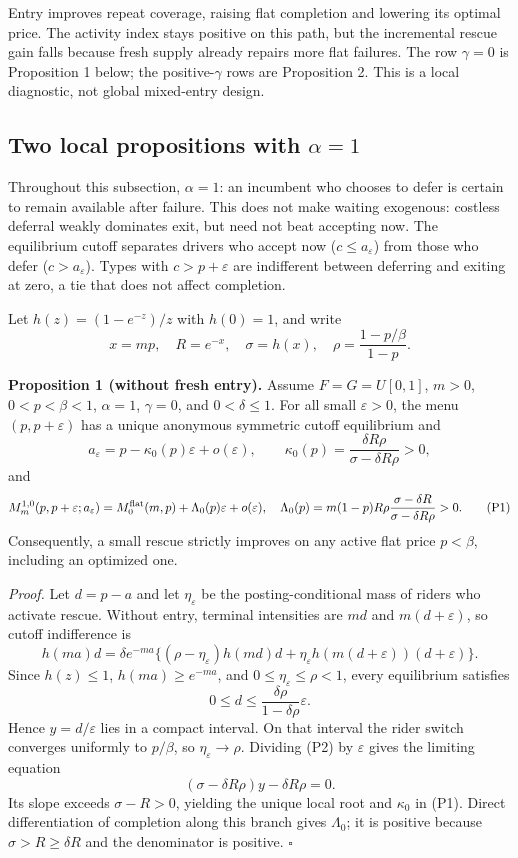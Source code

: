 \documentclass[11pt]{article}
\begin{document}
\noindent Entry improves repeat coverage, raising flat completion and lowering
its optimal price.  The activity index stays positive on this path, but the
incremental rescue gain falls because fresh supply already repairs more flat
failures.  The row $\gamma=0$ is Proposition 1 below; the positive-$\gamma$
rows are Proposition 2.  This is a local diagnostic, not global mixed-entry
design.

\clearpage
\subsection{Two local propositions with $\alpha=1$}

Throughout this subsection, $\alpha=1$: an incumbent who chooses to defer is
certain to remain available after failure.  This does not make waiting
exogenous: costless deferral weakly dominates exit, but need not beat accepting
now.  The equilibrium cutoff separates drivers who accept now
($c\le a_\varepsilon$) from those who defer ($c>a_\varepsilon$).  Types with
$c>p+\varepsilon$ are indifferent between deferring and exiting at zero, a
tie that does not affect completion.

Let $h(z)=(1-e^{-z})/z$ with $h(0)=1$, and write
\[
x=mp,\quad R=e^{-x},\quad \sigma=h(x),\quad
\rho=\frac{1-p/\beta}{1-p}.
\]

\noindent\textbf{Proposition 1 (without fresh entry).}
Assume $F=G=U[0,1]$, $m>0$, $0<p<\beta<1$,
$\alpha=1$, $\gamma=0$, and $0<\delta\le1$.  For all small
$\varepsilon>0$, the menu
$(p,p+\varepsilon)$ has a unique anonymous symmetric
cutoff equilibrium and
\[
a_\varepsilon=p-\kappa_0(p)\varepsilon+o(\varepsilon),\qquad
\kappa_0(p)=\frac{\delta R\rho}{\sigma-\delta R\rho}>0,
\]
and
\[
M_m^{1,0}(p,p+\varepsilon;a_\varepsilon)
=M_0^{\rm flat}(m,p)+\Lambda_0(p)\varepsilon+o(\varepsilon),
\quad
\Lambda_0(p)=m(1-p)R\rho
\frac{\sigma-\delta R}{\sigma-\delta R\rho}>0. \tag{P1}
\]
Consequently, a small rescue strictly improves on any active flat price
$p<\beta$, including an optimized one.

\medskip
\noindent\textit{Proof.}
Let $d=p-a$ and let $\eta_\varepsilon$ be the posting-conditional mass of
riders who activate rescue.  Without entry, terminal intensities are $md$ and
$m(d+\varepsilon)$, so cutoff indifference is
\[
h(ma)d=\delta e^{-ma}
\{(\rho-\eta_\varepsilon)h(md)d
+\eta_\varepsilon h(m(d+\varepsilon))(d+\varepsilon)\}. \tag{P2}
\]
Since $h(z)\le1$, $h(ma)\ge e^{-ma}$, and
$0\le\eta_\varepsilon\le\rho<1$, every equilibrium satisfies
\[
0\le d\le
\frac{\delta\rho}{1-\delta\rho}\varepsilon. \tag{P3}
\]
Hence $y=d/\varepsilon$ lies in a compact interval.  On that interval the
rider switch converges uniformly to $p/\beta$, so
$\eta_\varepsilon\to\rho$.  Dividing (P2) by $\varepsilon$ gives the limiting
equation
\[
(\sigma-\delta R\rho)y-\delta R\rho=0. \tag{P4}
\]
Its slope exceeds $\sigma-R>0$, yielding the unique local root and
$\kappa_0$ in (P1).  Direct differentiation of completion along this branch
gives $\Lambda_0$; it is positive because $\sigma>R\ge\delta R$ and the
denominator is positive. \hfill$\square$
\end{document}
